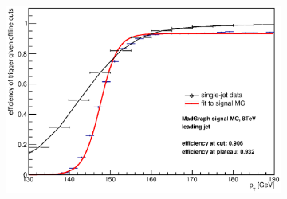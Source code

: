\begin{figure}[phtb!]
  \begin{center}
  \begin{subfigure}[leading jet, $m_{A}=400$ GeV]{0.45\textwidth}\includegraphics[width=\textwidth]{Systematics/images/jet0_trigger_turn_on_all_j35.eps}\end{subfigure}

\end{center}
\end{figure}

